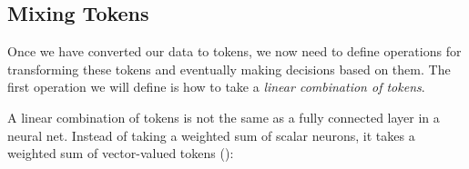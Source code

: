 \subsection{Mixing Tokens}
Once we have converted our data to tokens, we now need to define operations for transforming these tokens and eventually making decisions based on them. The first operation we will define is how to take a \textit{linear combination of tokens}.

A linear combination of tokens is not the same as a fully connected layer in a neural net. Instead of taking a weighted sum of scalar neurons, it takes a weighted sum of vector-valued tokens (\fig{\ref{fig:transformers:lin_bomb_neurons_vs_tokens}}): %

